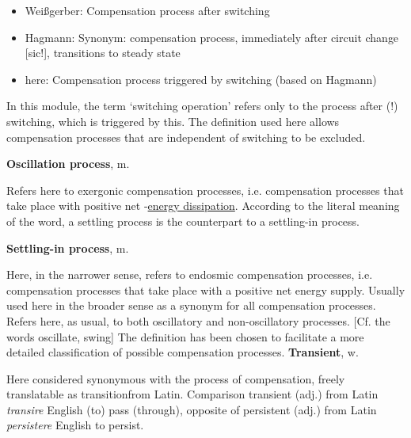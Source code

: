 {\begin{frame}
        \begin{itemize}
            \item Weißgerber: Compensation process after switching\cite[p. 1]{weissgerber3}
            \item Hagmann: Synonym: compensation process, immediately after circuit change [sic!], transitions to steady state\cite[p. 362]{hagmann}   
            \item here: Compensation process triggered by switching (based on Hagmann)
        \end{itemize}

        In this module, the term ‘switching operation’ refers only to the process after (!) switching, which is triggered by this.
        The definition used here allows compensation processes that are independent of switching to be excluded.
 

    \textbf{Oscillation process}, m.
    
        Refers here to exergonic compensation processes, i.e. compensation processes that take place with positive net -\underline{energy dissipation}. 
        According to the literal meaning of the word, a settling process is the counterpart to a settling-in process.

    \textbf{Settling-in process}, m.

        Here, in the narrower sense, refers to endosmic compensation processes, i.e. compensation processes that take place with a positive net energy supply.
        Usually used here in the broader sense as a synonym for all compensation processes.     
        Refers here, as usual, to both oscillatory and non-oscillatory processes. [Cf. the words oscillate, swing]
        The definition has been chosen to facilitate a more detailed classification of possible compensation processes.    
    \textbf{Transient}, w. %

        Here considered synonymous with the process of compensation, freely translatable as \glqq transition\grqq from Latin.
        Comparison transient (adj.) from Latin \textit{transire} English (to) pass (through), 
        opposite of persistent (adj.) from Latin \textit{persistere} English to persist.

\end{frame}
}%

